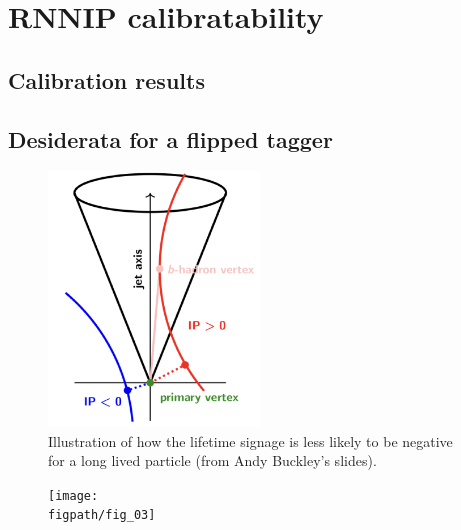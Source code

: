 \section{RNNIP calibratability}

\subsection{Calibration results}

\def\figpath{figures/ftag/DL1r-calibration}

\begin{figure}[htbp]
    \centering
    \caption{}
    \label{fig:pflow-calib}
\end{figure}

\subsection{Desiderata for a flipped tagger}


\begin{figure}[htbp]
  \centering
 \includegraphics[width=0.5\textwidth]{figures/ftag/fipped-tagger-graphic}
 \caption{Illustration of how the lifetime signage is less likely to be negative for a long lived particle (from Andy Buckley's slides).}
 \label{fig:lifetime-signage}
\end{figure}


\begin{figure}[htbp]
    \centering
    \texttt{[image: \\figpath/fig\_03]}
    \caption{}
    \label{fig:pflow-calib-light}
\end{figure}